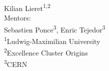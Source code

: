 \begin{frame}{}
	\begin{center}
		{
			{
				\Large \inserttitle
			}\\[0.7ex]
			{
				\large \insertsubtitle
			}
		}\\[2ex]
	   Kilian Lieret\textsuperscript{1,2}\\[2ex]
	   {
	   	\small
	   	Mentors:\\[0ex]
	   	Sebastien Ponce\textsuperscript{3}, 
	   	Enric Tejedor\textsuperscript{3}
	   }
	   \\[2.5 ex]
	   {
	   	\footnotesize
	   	\textsuperscript{1}Ludwig-Maximilian University\\%
	   	\textsuperscript{2}Excellence Cluster Origins\\%
	   	\vspace{-0.5ex}\textsuperscript{3}CERN
	   }\\[2.5ex]
		

\end{center}
\end{frame}
